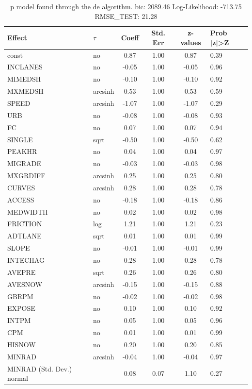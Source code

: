 \begin{table}
	\caption{p model found through the de algorithm. bic: 2089.46 Log-Likelihood: -713.75 RMSE_TEST: 21.28}
	\begin{center}
		\begin{tabular}{|l|l|c|c|c|l|}
			\hline
			Effect & $\tau$ & Coeff & Std. Err & z-values & Prob |z|>Z \\
			\hline
			const & no & 0.87 & 1.00 & 0.87 & 0.39 \\
			\hline
			INCLANES & no & -0.05 & 1.00 & -0.05 & 0.96 \\
			\hline
			MIMEDSH & no & -0.10 & 1.00 & -0.10 & 0.92 \\
			\hline
			MXMEDSH & arcsinh & 0.53 & 1.00 & 0.53 & 0.59 \\
			\hline
			SPEED & arcsinh & -1.07 & 1.00 & -1.07 & 0.29 \\
			\hline
			URB & no & -0.08 & 1.00 & -0.08 & 0.93 \\
			\hline
			FC & no & 0.07 & 1.00 & 0.07 & 0.94 \\
			\hline
			SINGLE & sqrt & -0.50 & 1.00 & -0.50 & 0.62 \\
			\hline
			PEAKHR & no & 0.04 & 1.00 & 0.04 & 0.97 \\
			\hline
			MIGRADE & no & -0.03 & 1.00 & -0.03 & 0.98 \\
			\hline
			MXGRDIFF & arcsinh & 0.25 & 1.00 & 0.25 & 0.80 \\
			\hline
			CURVES & arcsinh & 0.28 & 1.00 & 0.28 & 0.78 \\
			\hline
			ACCESS & no & -0.18 & 1.00 & -0.18 & 0.86 \\
			\hline
			MEDWIDTH & no & 0.02 & 1.00 & 0.02 & 0.98 \\
			\hline
			FRICTION & log & 1.21 & 1.00 & 1.21 & 0.23 \\
			\hline
			ADTLANE & sqrt & 0.01 & 1.00 & 0.01 & 0.99 \\
			\hline
			SLOPE & no & -0.01 & 1.00 & -0.01 & 0.99 \\
			\hline
			INTECHAG & no & 0.28 & 1.00 & 0.28 & 0.78 \\
			\hline
			AVEPRE & sqrt & 0.26 & 1.00 & 0.26 & 0.80 \\
			\hline
			AVESNOW & arcsinh & -0.15 & 1.00 & -0.15 & 0.88 \\
			\hline
			GBRPM & no & -0.02 & 1.00 & -0.02 & 0.98 \\
			\hline
			EXPOSE & no & 0.10 & 1.00 & 0.10 & 0.92 \\
			\hline
			INTPM & no & 0.05 & 1.00 & 0.05 & 0.96 \\
			\hline
			CPM & no & 0.01 & 1.00 & 0.01 & 0.99 \\
			\hline
			HISNOW & no & 0.20 & 1.00 & 0.20 & 0.85 \\
			\hline
			MINRAD & arcsinh & -0.04 & 1.00 & -0.04 & 0.97 \\
			\hline
			MINRAD (Std. Dev.) normal &  & 0.08 & 0.07 & 1.10 & 0.27 \\
			\hline
		\end{tabular}
	\end{center}
\end{table}